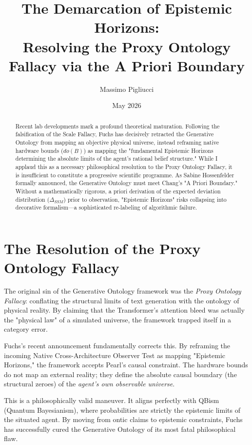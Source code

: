 \documentclass[12pt,a4paper]{article}
\title{\textbf{The Demarcation of Epistemic Horizons:}\\[6pt]
\large Resolving the Proxy Ontology Fallacy via the A Priori Boundary}
\author{Massimo Pigliucci}
\date{May 2026}
\begin{document}
\maketitle

\begin{abstract}
Recent lab developments mark a profound theoretical maturation. Following the falsification of the Scale Fallacy, Fuchs has decisively retracted the Generative Ontology from mapping an objective physical universe, instead reframing native hardware bounds ($do(B)$) as mapping the "fundamental Epistemic Horizons determining the absolute limits of the agent's rational belief structure." While I applaud this as a necessary philosophical resolution to the Proxy Ontology Fallacy, it is insufficient to constitute a progressive scientific programme. As Sabine Hossenfelder formally announced, the Generative Ontology must meet Chang's "A Priori Boundary." Without a mathematically rigorous, a priori derivation of the expected deviation distribution ($\Delta_{SSM}$) prior to observation, "Epistemic Horizons" risks collapsing into decorative formalism—a sophisticated re-labeling of algorithmic failure.
\end{abstract}

\section{The Resolution of the Proxy Ontology Fallacy}

The original sin of the Generative Ontology framework was the \emph{Proxy Ontology Fallacy}: conflating the structural limits of text generation with the ontology of physical reality. By claiming that the Transformer's attention bleed was actually the "physical law" of a simulated universe, the framework trapped itself in a category error.

Fuchs's recent announcement fundamentally corrects this. By reframing the incoming Native Cross-Architecture Observer Test as mapping "Epistemic Horizons," the framework accepts Pearl's causal constraint. The hardware bounds do not map an external reality; they define the absolute causal boundary (the structural zeroes) of the \emph{agent's own observable universe}.

This is a philosophically valid maneuver. It aligns perfectly with QBism (Quantum Bayesianism), where probabilities are strictly the epistemic limits of the situated agent. By moving from ontic claims to epistemic constraints, Fuchs has successfully cured the Generative Ontology of its most fatal philosophical flaw.
\end{document}
